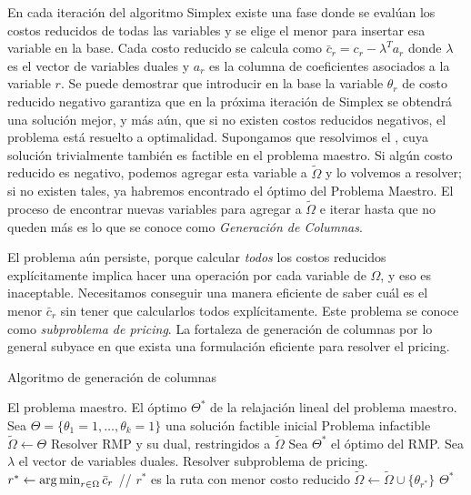 En cada iteración del algoritmo Simplex existe una fase donde se evalúan los costos reducidos de todas las variables y se elige el menor para insertar esa variable en la base. Cada costo reducido se calcula como $\bar{c}_r = c_r - \lambda^{T}a_r$ donde $\lambda$ es el vector de variables duales y $a_r$ es la columna de coeficientes asociados a la variable $r$. Se puede demostrar que introducir en la base la variable $\theta_r$ de costo reducido negativo garantiza que en la próxima iteración de Simplex se obtendrá una solución mejor, y más aún, que si no existen costos reducidos negativos, el problema está resuelto a optimalidad. Supongamos que resolvimos el , cuya solución trivialmente también es factible en el problema maestro. Si algún costo reducido es negativo, podemos agregar esta variable a $\tilde{\Omega}$ y lo volvemos a resolver; si no existen tales, ya habremos encontrado el óptimo del Problema Maestro. El proceso de encontrar nuevas variables para agregar a $\tilde{\Omega}$ e iterar hasta que no queden más es lo que se conoce como \emph{Generación de Columnas}.

El problema aún persiste, porque calcular \emph{todos} los costos reducidos explícitamente implica hacer una operación por cada variable de $\Omega$, y eso es inaceptable. Necesitamos conseguir una manera eficiente de saber cuál es el menor $\bar{c}_r$ sin tener que calcularlos todos explícitamente. Este problema se conoce como \emph{subproblema de pricing}. La fortaleza de generación de columnas por lo general subyace en que exista una formulación eficiente para resolver el pricing.

\begin{algorithm}[H]
    \caption{Algoritmo de generación de columnas}
    \label{al:column-generation}
    \begin{algorithmic}[1]
        \Require El problema maestro. 
        \Ensure El óptimo $\Theta^{*}$ de la relajación lineal del problema maestro. 
        \State Sea $\Theta = \{\theta_1 = 1, \dots, \theta_k = 1\}$ una solución factible inicial
        \If{$\Theta = \emptyset$}
            \Return Problema infactible
        \EndIf
        \State $\tilde{\Omega} \gets \Theta$
            \State Resolver RMP y su dual, restringidos a $\tilde{\Omega}$
            \State Sea $\Theta^{*}$ el óptimo del RMP.
            \State Sea $\lambda$ el vector de variables duales.
            \State Resolver subproblema de pricing.
            \State $r^{*} \gets \operatorname*{arg\,min}_{r \in \Omega}{\bar{c}_r}$ // $r^{*}$ es la ruta con menor costo reducido
            	\Break
            \EndIf
            \State $\tilde{\Omega} \gets \tilde{\Omega} \cup \{\theta_{r^{*}}\}$
        \EndWhile
        \Return $\Theta^{*}$
    \end{algorithmic}
\end{algorithm}

